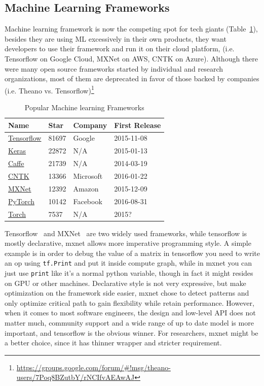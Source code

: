 \documentclass{article}
\begin{document}
\subsection{Machine Learning Frameworks}
\label{subsec:ml-frameworks}

Machine learning framework is now the competing spot for tech giants (Table~\ref{table:ml-frameworks}), besides they are using ML excessively in their own products,
they want developers to use their framework and run it on their cloud platform, (i.e. Tensorflow on Google Cloud, MXNet on AWS, CNTK on Azure).
Although there were many open source frameworks started by individual and research organizations, most of them are deprecated
in favor of those backed by companies (i.e. Theano vs. Tensorflow)\footnote{\url{https://groups.google.com/forum/\#!msg/theano-users/7Poq8BZutbY/rNCIfvAEAwAJ}}

\begin{table}[h]
    \caption{Popular Machine learning Frameworks}
    \label{table:ml-frameworks}
    \centering
    \begin{tabular}{llll}
        \toprule
        Name & Star & Company & First Release\\
        \midrule
        \href{https://github.com/tensorflow/tensorflow}{Tensorflow} & 81697 & Google & 2015-11-08 \\
        \href{https://github.com/keras-team/keras}{Keras} & 22872 & N/A & 2015-01-13 \\
        \href{https://github.com/BVLC/caffe}{Caffe} & 21739 & N/A & 2014-03-19 \\
        \href{https://github.com/Microsoft/CNTK}{CNTK} & 13366 & Microsoft & 2016-01-22 \\
        \href{https://github.com/apache/incubator-mxnet}{MXNet} & 12392 & Amazon & 2015-12-09 \\
        \href{https://github.com/pytorch/pytorch}{PyTorch} & 10142 & Facebook & 2016-08-31 \\
        \href{https://github.com/torch/torch7}{Torch} & 7537 & N/A & 2015? \\
        \bottomrule
    \end{tabular}
\end{table}

Tensorflow~\cite{abadi2016tensorflow} and MXNet~\cite{chen2015mxnet} are two widely used frameworks, while tensorflow is
mostly declarative, mxnet allows more imperative programming style.
A simple example is in order to debug the value of a matrix in tensorflow you need to write an op using \verb+tf.Print+ and put it inside compute graph,
while in mxnet you can just use \verb+print+ like it's a normal python variable, though in fact it might resides on GPU or other machines.
Declarative style is not very expressive, but make optimization on the framework side easier, mxnet chose to detect patterns
and only optimize critical path to gain flexibility while retain performance.
However, when it comes to most software engineers, the design and low-level API does not matter much,
community support and a wide range of up to date model is more important, and tensorflow is the obvious winner.
For researchers, mxnet might be a better choice, since it has thinner wrapper and stricter requirement.
\end{document}
